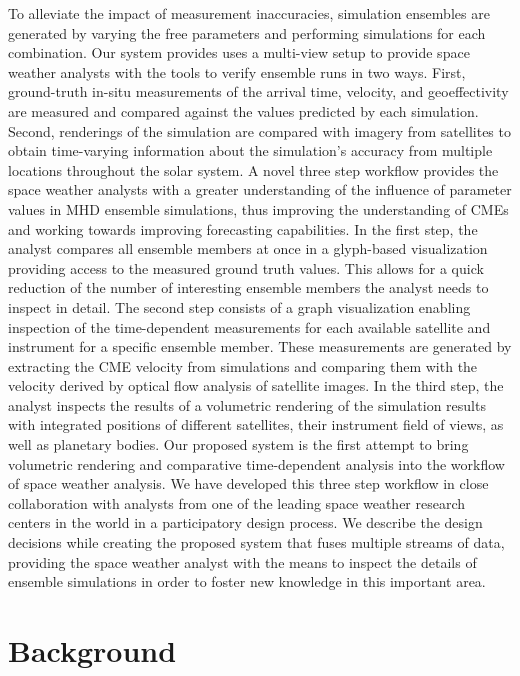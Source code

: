 \documentclass[journal]{vgtc}                %
\begin{document}
To alleviate the impact of measurement inaccuracies, simulation ensembles are generated by varying the free parameters and performing simulations for each combination. Our system provides uses a multi-view setup to provide space weather analysts with the tools to verify ensemble runs in two ways. First, ground-truth in-situ measurements of the arrival time, velocity, and geoeffectivity are measured and compared against the values predicted by each simulation. Second, renderings of the simulation are compared with imagery from satellites to obtain time-varying information about the simulation's accuracy from multiple locations throughout the solar system. A novel three step workflow provides the space weather analysts with a greater understanding of the influence of parameter values in MHD ensemble simulations, thus improving the understanding of CMEs and working towards improving forecasting capabilities. In the first step, the analyst compares all ensemble members at once in a glyph-based visualization providing access to the measured ground truth values. This allows for a quick reduction of the number of interesting ensemble members the analyst needs to inspect in detail. The second step consists of a graph visualization enabling inspection of the time-dependent measurements for each available satellite and instrument for a specific ensemble member. These measurements are generated by extracting the CME velocity from simulations and comparing them with the velocity derived by optical flow analysis of satellite images. In the third step, the analyst inspects the results of a volumetric rendering of the simulation results with integrated positions of different satellites, their instrument field of views, as well as planetary bodies. Our proposed system is the first attempt to bring volumetric rendering and comparative time-dependent analysis into the workflow of space weather analysis. We have developed this three step workflow in close collaboration with analysts from one of the leading space weather research centers in the world in a participatory design process. We describe the design decisions while creating the proposed system that fuses multiple streams of data, providing the space weather analyst with the means to inspect the details of ensemble simulations in order to foster new knowledge in this important area.

\section{Background}
\end{document}
